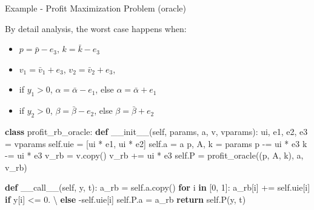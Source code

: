 \documentclass[
  ignorenonframetext,
  aspectratio=169,
  serif,onlymath]{beamer}
\newenvironment{Shaded}{}{}
\newcommand{\ControlFlowTok}[1]{\textcolor[rgb]{0.00,0.44,0.13}{\textbf{#1}}}
\newcommand{\DecValTok}[1]{\textcolor[rgb]{0.25,0.63,0.44}{#1}}
\newcommand{\FloatTok}[1]{\textcolor[rgb]{0.25,0.63,0.44}{#1}}
\newcommand{\FunctionTok}[1]{\textcolor[rgb]{0.02,0.16,0.49}{#1}}
\newcommand{\KeywordTok}[1]{\textcolor[rgb]{0.00,0.44,0.13}{\textbf{#1}}}
\newcommand{\NormalTok}[1]{#1}
\newcommand{\OperatorTok}[1]{\textcolor[rgb]{0.40,0.40,0.40}{#1}}
\newcommand{\VariableTok}[1]{\textcolor[rgb]{0.10,0.09,0.49}{#1}}
\providecommand{\tightlist}{%
  \setlength{\itemsep}{0pt}\setlength{\parskip}{0pt}}
\begin{document}
\begin{frame}{Example - Profit Maximization Problem (oracle)}
\protect\hypertarget{example---profit-maximization-problem-oracle}{}

By detail analysis, the worst case happens when:

\begin{itemize}
\tightlist
\item
  \(p = \bar{p} - e_3\), \(k = \bar{k} - e_3\)
\item
  \(v_1 = \bar{v}_1 + e_3\), \(v_2 = \bar{v}_2 + e_3\),
\item
  if \(y_1 > 0\), \(\alpha = \bar{\alpha} - e_1\), else
  \(\alpha = \bar{\alpha} + e_1\)
\item
  if \(y_2 > 0\), \(\beta = \bar{\beta} - e_2\), else
  \(\beta = \bar{\beta} + e_2\)
\end{itemize}

\end{frame}

\begin{frame}[fragile]

\scriptsize

\begin{Shaded}
\begin{Highlighting}[]
\KeywordTok{class}\NormalTok{ profit_rb_oracle:}
    \KeywordTok{def} \FunctionTok{__init__}\NormalTok{(}\VariableTok{self}\NormalTok{, params, a, v, vparams):}
\NormalTok{        ui, e1, e2, e3 }\OperatorTok{=}\NormalTok{ vparams}
        \VariableTok{self}\NormalTok{.uie }\OperatorTok{=}\NormalTok{ [ui }\OperatorTok{*}\NormalTok{ e1, ui }\OperatorTok{*}\NormalTok{ e2]}
        \VariableTok{self}\NormalTok{.a }\OperatorTok{=}\NormalTok{ a}
\NormalTok{        p, A, k }\OperatorTok{=}\NormalTok{ params}
\NormalTok{        p }\OperatorTok{-=}\NormalTok{ ui }\OperatorTok{*}\NormalTok{ e3}
\NormalTok{        k }\OperatorTok{-=}\NormalTok{ ui }\OperatorTok{*}\NormalTok{ e3}
\NormalTok{        v_rb }\OperatorTok{=}\NormalTok{ v.copy()}
\NormalTok{        v_rb }\OperatorTok{+=}\NormalTok{ ui }\OperatorTok{*}\NormalTok{ e3}
        \VariableTok{self}\NormalTok{.P }\OperatorTok{=}\NormalTok{ profit_oracle((p, A, k), a, v_rb)}

    \KeywordTok{def} \FunctionTok{__call__}\NormalTok{(}\VariableTok{self}\NormalTok{, y, t):}
\NormalTok{        a_rb }\OperatorTok{=} \VariableTok{self}\NormalTok{.a.copy()}
        \ControlFlowTok{for}\NormalTok{ i }\KeywordTok{in}\NormalTok{ [}\DecValTok{0}\NormalTok{, }\DecValTok{1}\NormalTok{]:}
\NormalTok{            a_rb[i] }\OperatorTok{+=} \VariableTok{self}\NormalTok{.uie[i] }\ControlFlowTok{if}\NormalTok{ y[i] }\OperatorTok{<=} \FloatTok{0.} \OperatorTok{\textbackslash{}}
                              \ControlFlowTok{else} \OperatorTok{-}\VariableTok{self}\NormalTok{.uie[i]}
        \VariableTok{self}\NormalTok{.P.a }\OperatorTok{=}\NormalTok{ a_rb}
        \ControlFlowTok{return} \VariableTok{self}\NormalTok{.P(y, t)}
\end{Highlighting}
\end{Shaded}

\end{frame}
\end{document}
